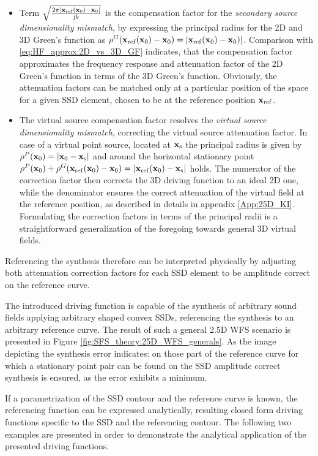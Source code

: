 \begin{itemize}
\item Term $\sqrt{\frac{ 2\pi |\mathbf{x}_{\mathrm{ref}}(\mathbf{x}_0)-\mathbf{x}_0| }{ \mathrm{j} k }}$ is the compensation factor for the \emph{secondary source dimensionality mismatch}, by expressing the principal radius for the 2D and 3D Green's function as $\rho^G(\mathbf{x}_{\mathrm{ref}}(\mathbf{x}_0)-\mathbf{x}_0) = |\mathbf{x}_{\mathrm{ref}}(\mathbf{x}_0)-\mathbf{x}_0)|$.
	Comparison with \eqref{eq:HF_approx:2D_vs_3D_GF} indicates, that the compensation factor approximates the frequency response and attenuation factor of the 2D Green's function in terms of the 3D Green's function.
	Obviously, the attenuation factors can be matched only at a particular position of the space for a given SSD element, chosen to be at the reference position $\mathbf{x}_{\mathrm{ref}}$.
%
\item The virtual source compensation factor resolves the \emph{virtual source dimensionality mismatch}, correcting the virtual source attenuation factor.
In case of a virtual point source, located at $\mathbf{x}_{\mathrm{s}}$ the principal radius is given by $\rho^P(\mathbf{x}_0)=|\mathbf{x}_0-\mathbf{x}_{\mathrm{s}}|$ and around the horizontal stationary point $\rho^P(\mathbf{x}_0) +  \rho^G(\mathbf{x}_{\mathrm{ref}}(\mathbf{x}_0)-\mathbf{x}_0) = |\mathbf{x}_{\mathrm{ref}}(\mathbf{x}_0)-\mathbf{x}_{\mathrm{s}}|$ holds.
The numerator of the correction factor then corrects the 3D driving function to an ideal 2D one, while the denominator ensures the correct attenuation of the virtual field at the reference position, as described in details in appendix \ref{App:25D_KI}.
Formulating the correction factors in terms of the principal radii is a straightforward generalization of the foregoing towards general 3D virtual fields.
\end{itemize}
Referencing the synthesis therefore can be interpreted physically by adjusting both attenuation correction factors for each SSD element to be amplitude correct on the reference curve.

\vspace{3mm}
The introduced driving function is capable of the synthesis of arbitrary sound fields applying arbitrary shaped convex SSDs, referencing the synthesis to an arbitrary reference curve. 
The result of such a general 2.5D WFS scenario is presented in Figure \ref{fig:SFS_theory:25D_WFS_generals}.
As the image depicting the synthesis error indicates: on those part of the reference curve for which a stationary point pair can be found on the SSD amplitude correct synthesis is ensured, as the error exhibits a minimum.
%

If a parametrization of the SSD contour and the reference curve is known, the referencing function can be expressed analytically, resulting closed form driving functions specific to the SSD and the referencing contour. 
The following two examples are presented in order to demonstrate the analytical application of the presented driving functions.

